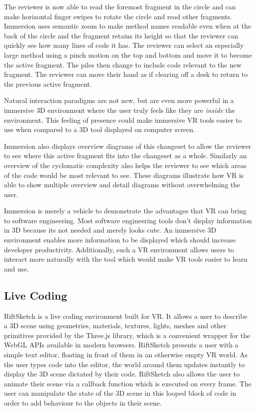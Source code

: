 \documentclass{acm_proc_article-sp}
\begin{document}
The reviewer is now able to read the foremost fragment in the circle and can make horizontal finger swipes to rotate the circle and read other fragments. Immersion uses semantic zoom to make method names readable even when at the back of the circle and the fragment retains its height so that the reviewer can quickly see how many lines of code it has. The reviewer can select an especially large method using a pinch motion on the top and bottom and move it to become the active fragment. The piles then change to include code relevant to the new fragment. The reviewer can move their hand as if clearing off a desk to return to the previous active fragment.

Natural interaction paradigms are not new, but are even more powerful in a immersive 3D environment where the user truly feels like they are \textit{inside} the environment. This feeling of presence could make immersive VR tools easier to use when compared to a 3D tool displayed on computer screen. 

Immersion also displays overview diagrams of this changeset to allow the reviewer to see where this active fragment fits into the changeset as a whole. Similarly an overview of the cyclomatic complexity also helps the reviewer to see which areas of the code would be most relevant to see. These diagrams illustrate how VR is able to show multiple overview and detail diagrams without overwhelming the user.

Immersion is merely a vehicle to demonstrate the advantages that VR can bring to software engineering. Most software engineering tools don't display information in 3D because its not needed and merely looks cute. An immersive 3D environment enables more information to be displayed which should increase developer productivity.  Additionally, such a VR environment allows users to interact more naturally with the tool which would make VR tools easier to learn and use.

\subsection{Live Coding}
RiftSketch is a live coding environment built for VR. It allows a user to describe a 3D scene using geometries, materials, textures, lights, meshes and other primitives provided by the Three.js library, which is a convenient wrapper for the WebGL APIs available in modern browsers. RiftSketch presents a user with a simple text editor, floating in front of them in an otherwise empty VR world. As the user types code into the editor, the world around them updates instantly to display the 3D scene dictated by their code. RiftSketch also allows the user to animate their scene via a callback function which is executed on every frame. The user can manipulate the state of the 3D scene in this looped block of code in order to add behaviour to the objects in their scene.
\end{document}
